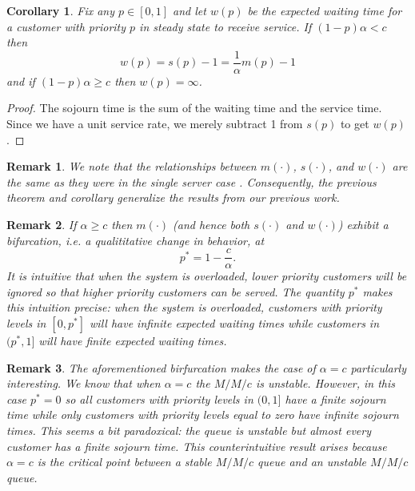 \documentclass[conference]{IEEEtran}
\newtheorem{remark}{Remark}
\newtheorem{corollary}{Corollary}
\begin{document}
\begin{corollary}
  Fix any $p \in [0, 1]$ and let $w(p)$ be the expected waiting time
  for a customer with priority $p$ in steady state to receive
  service. If $(1-p)\alpha < c$ then
  \begin{equation}
    w(p) = s(p) - 1 = \frac{1}{\alpha}m(p) - 1
  \end{equation}
  and if $(1-p)\alpha \geq c$ then $w(p) = \infty$.
\end{corollary}
\begin{proof}
  The sojourn time is the sum of the waiting time and the service
  time. Since we have a unit service rate, we merely subtract 1 from
  $s(p)$ to get $w(p)$.
\end{proof}

\begin{remark}
  We note that the relationships between $m(\cdot)$, $s(\cdot)$, and
  $w(\cdot)$ are the same as they were in the single server case
  \cite{Master_ACC_2017}. Consequently, the previous theorem and
  corollary generalize the results from our previous work.
\end{remark}

\begin{remark}
  If $\alpha \geq c$ then $m(\cdot)$ (and hence both $s(\cdot)$ and
  $w(\cdot)$) exhibit a bifurcation, i.e. a qualititative change in
  behavior, at
  \begin{equation}
    p^* = 1 - \frac{c}{\alpha}.
  \end{equation}
  It is intuitive that when the system is overloaded, lower priority
  customers will be ignored so that higher priority customers can be
  served. The quantity $p^*$ makes this intuition precise: when the
  system is overloaded, customers with priority levels in $[0, p^*]$
  will have infinite expected waiting times while customers in $(p^*,
  1]$ will have finite expected waiting times.
\end{remark}

\begin{remark}
  The aforementioned birfurcation makes the case of $\alpha = c$
  particularly interesting. We know that when $\alpha = c$ the $M/M/c$
  is unstable. However, in this case $p^* = 0$ so all customers with
  priority levels in $(0, 1]$ have a finite sojourn time while only
  customers with priority levels equal to zero have infinite sojourn
  times. This seems a bit paradoxical: the queue is unstable but
  almost every customer has a finite sojourn time. This
  counterintuitive result arises because $\alpha = c$ is the critical
  point between a stable $M/M/c$ queue and an unstable $M/M/c$ queue.
\end{remark}
\end{document}
